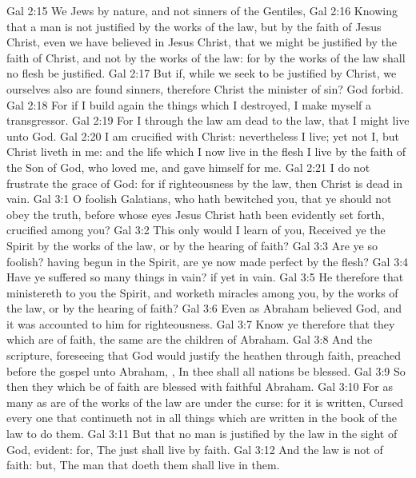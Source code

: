 \vs Gal 2:15 We  Jews by nature, and not sinners of the Gentiles,
\vs Gal 2:16 Knowing that a man is not justified by the works of the law, but by the faith of Jesus Christ, even we have believed in Jesus Christ, that we might be justified by the faith of Christ, and not by the works of the law: for by the works of the law shall no flesh be justified.
\vs Gal 2:17 But if, while we seek to be justified by Christ, we ourselves also are found sinners,  therefore Christ the minister of sin? God forbid.
\vs Gal 2:18 For if I build again the things which I destroyed, I make myself a transgressor.
\vs Gal 2:19 For I through the law am dead to the law, that I might live unto God.
\vs Gal 2:20 I am crucified with Christ: nevertheless I live; yet not I, but Christ liveth in me: and the life which I now live in the flesh I live by the faith of the Son of God, who loved me, and gave himself for me.
\vs Gal 2:21 I do not frustrate the grace of God: for if righteousness  by the law, then Christ is dead in vain.
\vs Gal 3:1 O foolish Galatians, who hath bewitched you, that ye should not obey the truth, before whose eyes Jesus Christ hath been evidently set forth, crucified among you?
\vs Gal 3:2 This only would I learn of you, Received ye the Spirit by the works of the law, or by the hearing of faith?
\vs Gal 3:3 Are ye so foolish? having begun in the Spirit, are ye now made perfect by the flesh?
\vs Gal 3:4 Have ye suffered so many things in vain? if  yet in vain.
\vs Gal 3:5 He therefore that ministereth to you the Spirit, and worketh miracles among you,  by the works of the law, or by the hearing of faith?
\vs Gal 3:6 Even as Abraham believed God, and it was accounted to him for righteousness.
\vs Gal 3:7 Know ye therefore that they which are of faith, the same are the children of Abraham.
\vs Gal 3:8 And the scripture, foreseeing that God would justify the heathen through faith, preached before the gospel unto Abraham, , In thee shall all nations be blessed.
\vs Gal 3:9 So then they which be of faith are blessed with faithful Abraham.
\vs Gal 3:10 For as many as are of the works of the law are under the curse: for it is written, Cursed  every one that continueth not in all things which are written in the book of the law to do them.
\vs Gal 3:11 But that no man is justified by the law in the sight of God,  evident: for, The just shall live by faith.
\vs Gal 3:12 And the law is not of faith: but, The man that doeth them shall live in them.
